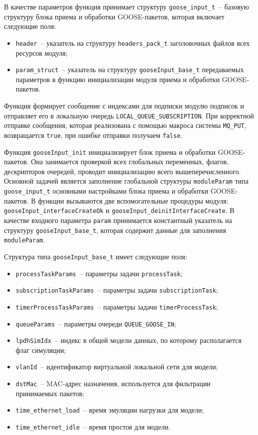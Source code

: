 В качестве параметров функция принимает структуру \lstinline{goose_input_t}~-- базовую структуру блока приема и обработки GOOSE-пакетов, которая включает следующие поля:

\begin{itemize}
    \item \lstinline{header}~-- указатель на структуру \lstinline{headers_pack_t} заголовочных файлов всех ресурсов модуля;
    \item \lstinline{param_struct}~-- указатель на структуру \lstinline{gooseInput_base_t} передаваемых параметров в функцию инициализации модуля приема и обработки GOOSE-пакетов.
\end{itemize}

Функция формирует сообщение с индексами для подписки модулю подписок и отправляет его в локальную очередь \lstinline{LOCAL_QUEUE_SUBSCRIPTION}. При корректной отправке сообщения, которая реализована с помощью макроса системы \lstinline{MQ_PUT}, возвращается \lstinline{true}, при ошибке отправки получаем \lstinline{false}.

Функция \lstinline{gooseInput_init} инициализирует блок приема и обработки GOOSE-пакетов. Она занимается проверкой всех глобальных
переменных, флагов, дескрипторов очередей, проводит инициализацию всего вышеперечисленного. Основной задачей является заполнение
глобальной структуры \lstinline{moduleParam} типа \lstinline{goose_input_t} основными настройками блока приема и обработки GOOSE-пакетов. В функции вызываются две
вспомогательные процедуры модуля: \lstinline{gooseInput_interfaceCreateOk} и \lstinline{gooseInput_deinitInterfaceCreate}.
В качестве входного параметра \lstinline{param} принимается
константный указатель на структуру
\lstinline{gooseInput_base_t}, которая содержит данные для заполнения \lstinline{moduleParam}.

Структура типа \lstinline{gooseInput_base_t} имеет следующие поля:

\begin{itemize}
    \item \lstinline{processTaskParams}~-- параметры задачи \lstinline{processTask};
    \item \lstinline{subscriptionTaskParams}~-- параметры задачи \lstinline{subscriptionTask};
    \item \lstinline{timerProcessTaskParams}~-- параметры задачи \lstinline{timerProcessTask};
    \item \lstinline{queueParams}~-- параметры очереди \lstinline{QUEUE_GOOSE_IN};
    \item \lstinline{lpdhSimIdx}~-- индекс в общей модели данных, по которому располагается флаг симуляции;
    \item \lstinline{vlanId}~-- идентификатор виртуальной локальной сети для модели;
    \item \lstinline{dstMac}~-- MAC-адрес назначения, используется для фильтрации принимаемых пакетов;
    \item \lstinline{time_ethernet_load}~-- время эмуляции нагрузки для модели;
    \item \lstinline{time_ethernet_idle}~-- время простоя для модели.
\end{itemize}

